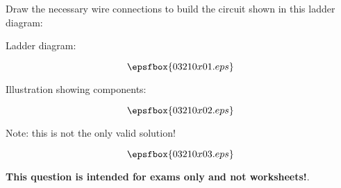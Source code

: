 

Draw the necessary wire connections to build the circuit shown in this ladder diagram:

\vskip 10pt

Ladder diagram:

$$\epsfbox{03210x01.eps}$$

\vskip 10pt

Illustration showing components:

$$\epsfbox{03210x02.eps}$$







Note: this is not the only valid solution!

$$\epsfbox{03210x03.eps}$$







{\bf This question is intended for exams only and not worksheets!}.




